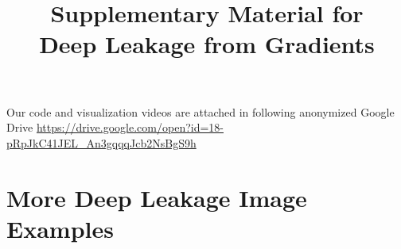 \documentclass{article}
\begin{document}
\title{Supplementary Material for \\ Deep Leakage from Gradients}
\maketitle

Our code and visualization videos are attached in following anonymized Google Drive \url{https://drive.google.com/open?id=18-pRpJkC41JEL_An3gqqqJcb2NsBgS9h} 

\section{More Deep Leakage Image Examples }



%     
%     
\end{document}
